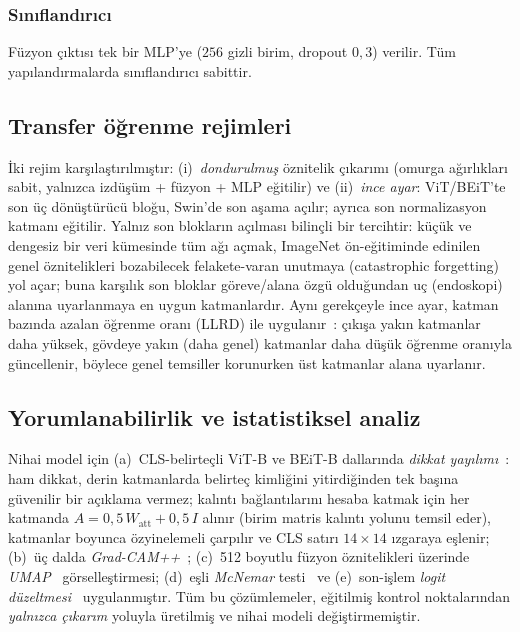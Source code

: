 \subsubsection{Sınıflandırıcı}
Füzyon çıktısı tek bir MLP'ye ($256$ gizli birim, dropout $0{,}3$) verilir.
Tüm yapılandırmalarda sınıflandırıcı sabittir.

\subsection{Transfer öğrenme rejimleri}
İki rejim karşılaştırılmıştır: (i)~\emph{dondurulmuş} öznitelik çıkarımı (omurga
ağırlıkları sabit, yalnızca izdüşüm + füzyon + MLP eğitilir) ve (ii)~\emph{ince
ayar}: ViT/BEiT'te son üç dönüştürücü bloğu, Swin'de son aşama açılır; ayrıca son
normalizasyon katmanı eğitilir. Yalnız son blokların açılması bilinçli bir tercihtir:
küçük ve dengesiz bir veri kümesinde tüm ağı açmak, ImageNet ön-eğitiminde edinilen
genel öznitelikleri bozabilecek felakete-varan unutmaya (catastrophic forgetting)
yol açar; buna karşılık son bloklar göreve/alana özgü olduğundan uç (endoskopi)
alanına uyarlanmaya en uygun katmanlardır. Aynı gerekçeyle ince ayar, katman bazında
azalan öğrenme oranı (LLRD) ile uygulanır~\cite{howard2018ulmfit}: çıkışa yakın
katmanlar daha yüksek, gövdeye yakın (daha genel) katmanlar daha düşük öğrenme
oranıyla güncellenir, böylece genel temsiller korunurken üst katmanlar alana uyarlanır.

\subsection{Yorumlanabilirlik ve istatistiksel analiz}
Nihai model için (a)~CLS-belirteçli ViT-B ve BEiT-B dallarında \emph{dikkat
yayılımı}~\cite{abnar2020rollout}: ham dikkat, derin katmanlarda belirteç kimliğini
yitirdiğinden tek başına güvenilir bir açıklama vermez; kalıntı bağlantılarını
hesaba katmak için her katmanda $A = 0{,}5\,W_\text{att} + 0{,}5\,I$ alınır (birim
matris kalıntı yolunu temsil eder), katmanlar boyunca özyinelemeli çarpılır ve CLS
satırı $14{\times}14$ ızgaraya eşlenir; (b)~üç dalda
\emph{Grad-CAM++}~\cite{chattopadhyay2018gradcampp};
(c)~512 boyutlu füzyon öznitelikleri üzerinde \emph{UMAP}~\cite{mcinnes2018umap}
görselleştirmesi; (d)~eşli \emph{McNemar} testi~\cite{dietterich1998mcnemar} ve
(e)~son-işlem \emph{logit düzeltmesi}~\cite{menon2020logitadjust} uygulanmıştır.
Tüm bu çözümlemeler, eğitilmiş kontrol noktalarından \emph{yalnızca çıkarım}
yoluyla üretilmiş ve nihai modeli değiştirmemiştir.
